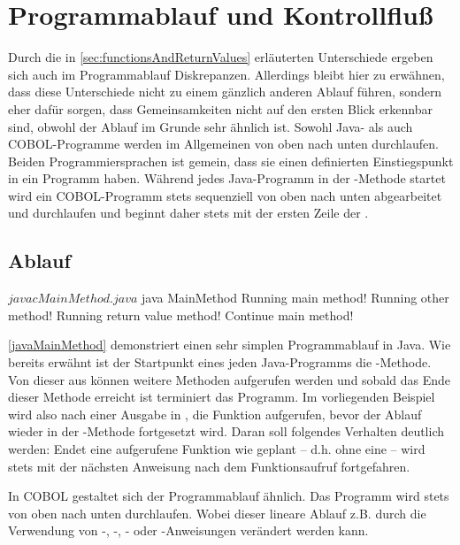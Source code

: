 \section{Programmablauf und Kontrollfluß}\label{programmablauf}
Durch die in \autoref{sec:functionsAndReturnValues} erläuterten Unterschiede ergeben sich auch im Programmablauf Diskrepanzen. Allerdings bleibt hier zu erwähnen, dass diese Unterschiede nicht zu einem gänzlich anderen Ablauf führen, sondern eher dafür sorgen, dass Gemeinsamkeiten nicht auf den ersten Blick erkennbar sind, obwohl der Ablauf im Grunde sehr ähnlich ist. Sowohl Java- als auch COBOL-Programme werden im Allgemeinen von oben nach unten durchlaufen. Beiden Programmiersprachen ist gemein, dass sie einen definierten Einstiegspunkt in ein Programm haben. Während jedes Java-Programm in der -Methode startet wird ein COBOL-Programm stets sequenziell von oben nach unten abgearbeitet und durchlaufen und beginnt daher stets mit der ersten Zeile der .

\subsection{Ablauf}
\sepCodeAndOutputCheck
\begin{shellwindow}
$ javac MainMethod.java 
$ java MainMethod
Running main method!
Running other method!
Running return value method!
Continue main method!
\end{shellwindow}

\autoref{javaMainMethod} demonstriert einen sehr simplen Programmablauf in Java. Wie bereits erwähnt ist der Startpunkt eines jeden Java-Programms die -Methode. Von dieser aus können weitere Methoden aufgerufen werden und sobald das Ende dieser Methode erreicht ist terminiert das Programm. Im vorliegenden Beispiel wird also nach einer Ausgabe in , die Funktion  aufgerufen, bevor der Ablauf wieder in der -Methode fortgesetzt wird. Daran soll folgendes Verhalten deutlich werden: Endet eine aufgerufene Funktion wie geplant -- d.h. ohne eine  -- wird stets mit der nächsten Anweisung nach dem Funktionsaufruf fortgefahren. 

In COBOL gestaltet sich der Programmablauf ähnlich. Das Programm wird stets von oben nach unten durchlaufen. Wobei dieser lineare Ablauf z.B. durch die Verwendung von -, -, - oder  -Anweisungen verändert werden kann.

